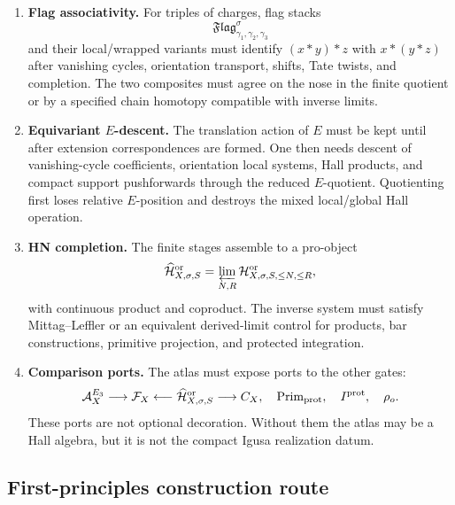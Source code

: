 \begin{enumerate}
\item \textbf{Flag associativity.}
For triples of charges, flag stacks
\[
   \mathfrak{Flag}_{\gamma_1,\gamma_2,\gamma_3}^{\sigma}
\]
and their local/wrapped variants must identify
\((x*y)*z\) with \(x*(y*z)\) after vanishing cycles, orientation
transport, shifts, Tate twists, and completion.  The two composites
must agree on the nose in the finite quotient or by a specified
chain homotopy compatible with inverse limits.

\item \textbf{Equivariant \(E\)-descent.}
The translation action of \(E\) must be kept until after extension
correspondences are formed.  One then needs descent of vanishing-cycle
coefficients, orientation local systems, Hall products, and compact
support pushforwards through the reduced \(E\)-quotient.  Quotienting
first loses relative \(E\)-position and destroys the mixed local/global
Hall operation.

\item \textbf{HN completion.}
The finite stages assemble to a pro-object
\[
   \widehat{\mathcal H}_{X,\sigma,S}^{\mathrm{or}}
   =
   \varprojlim_{N,R}
   \mathcal H^{\mathrm{or}}_{X,\sigma,S,\leq N,\leq R},
\]
with continuous product and coproduct.  The inverse system must satisfy
Mittag--Leffler or an equivalent derived-limit control for products,
bar constructions, primitive projection, and protected integration.

\item \textbf{Comparison ports.}
The atlas must expose ports to the other gates:
\[
   \mathcal A_X^{E_3}\longrightarrow
   \mathcal F_X\longleftarrow
   \widehat{\mathcal H}_{X,\sigma,S}^{\mathrm{or}}
   \longrightarrow
   C_X,\quad
   \operatorname{Prim}_{\mathrm{prot}},\quad
   I^{\mathrm{prot}},\quad
   \rho_o.
\]
These ports are not optional decoration.  Without them the atlas may be
a Hall algebra, but it is not the compact Igusa realization datum.
\end{enumerate}

\subsection{First-principles construction route}

